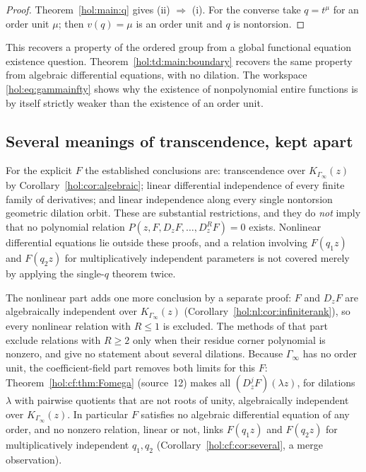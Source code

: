 \documentclass[11pt]{article}
\numberwithin{equation}{section}
\theoremstyle{definition}
\theoremstyle{remark}
\begin{document}
\begin{proof}
Theorem~\ref{hol:main:q} gives (ii) $\Rightarrow$ (i). For the converse take
$q=t^\mu$ for an order unit $\mu$; then $v(q)=\mu$ is an order unit and $q$ is
nontorsion.
\end{proof}

This recovers a property of the ordered group from a global functional
equation existence question. Theorem~\ref{hol:td:main:boundary} recovers the
same property from algebraic differential equations, with no dilation. The
workspace \eqref{hol:eq:gammainfty} shows why
the existence of nonpolynomial entire functions is by itself strictly weaker
than the existence of an order unit.

\subsection{Several meanings of transcendence, kept apart}

For the explicit $F$ the established conclusions are: transcendence over
$K_{\Gamma_\infty}(z)$ by Corollary~\ref{hol:cor:algebraic}; linear
differential independence of every finite family of derivatives; and linear
independence along every single nontorsion geometric dilation orbit. These are
substantial restrictions, and they do \emph{not} imply that no polynomial
relation $P(z,F,D_zF,\ldots,D_z^RF)=0$ exists. Nonlinear differential
equations lie outside these proofs, and a relation involving $F(q_1z)$ and
$F(q_2z)$ for multiplicatively independent parameters is not covered merely by
applying the single-$q$ theorem twice.

The nonlinear part adds one more conclusion by a separate proof: $F$ and
$D_zF$ are algebraically independent over $K_{\Gamma_\infty}(z)$
(Corollary~\ref{hol:nl:cor:infiniterank}), so every nonlinear relation with
$R\le1$ is excluded. The methods of that part exclude relations with $R\ge2$
only when their residue corner polynomial is nonzero, and give no statement
about several dilations. Because $\Gamma_\infty$ has no order unit, the
coefficient-field part removes both limits for this $F$:
Theorem~\ref{hol:cf:thm:Fomega} (source~12) makes all $(D_z^jF)(\lambda z)$,
for dilations $\lambda$ with pairwise quotients that are not roots of unity,
algebraically independent over $K_{\Gamma_\infty}(z)$. In particular $F$
satisfies no algebraic differential equation of any order, and no nonzero
relation, linear or not, links $F(q_1z)$ and $F(q_2z)$ for multiplicatively
independent $q_1,q_2$ (Corollary~\ref{hol:cf:cor:several}, a merge
observation).
\end{document}
